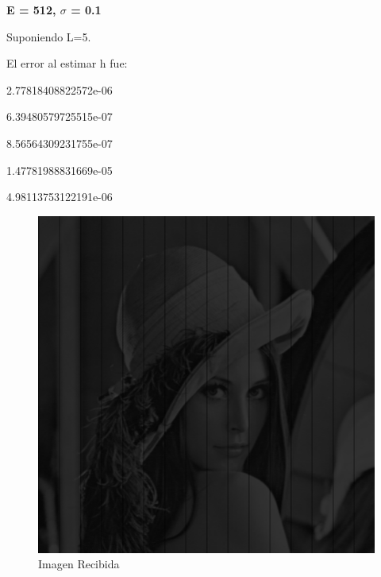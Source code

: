 \documentclass{article}
\begin{document}
\begin{multicols}{2}
\begin{figure}[H]
\end{figure}

\textbf{\large E = 512,  $\sigma$ = 0.1 }\\




\par \large{Suponiendo L=5.}
\par El error al estimar h fue:\\ 
\par   2.77818408822572e-06
\par   6.39480579725515e-07
\par   8.56564309231755e-07
\par   1.47781988831669e-05
\par   4.98113753122191e-06


\begin{figure}[H]
\centering
\includegraphics[scale=0.2]{../img/received_BONUS.png}
\caption{Imagen Recibida}

\end{figure}


\end{multicols}
\end{document}
